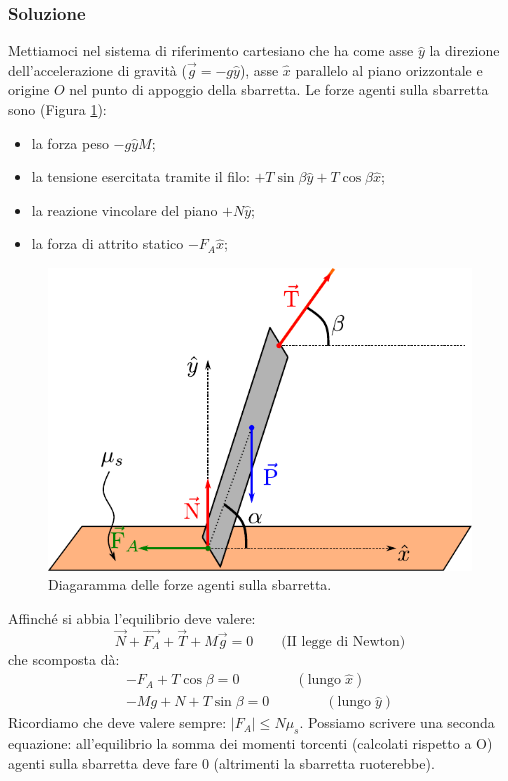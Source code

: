 \documentclass[12pt,a4paper]{book}
\begin{document}
\subsubsection*{Soluzione}
Mettiamoci nel sistema di riferimento cartesiano che ha come asse $\hat{y}$ la direzione dell'accelerazione di gravità
($\vec{g}=-g\hat{y}$), asse $\hat{x}$ parallelo al piano orizzontale e origine $O$ nel punto di appoggio della sbarretta.
Le forze agenti sulla sbarretta sono (Figura \ref{fig:sbar2}):
\begin{itemize}
\item la forza peso $-g\hat{y}M$;
\item la tensione esercitata tramite il filo: $+T\sin \beta \hat{y}+T\cos \beta \hat{x}$;
\item la reazione vincolare del piano $+N\hat{y}$;
\item la forza di attrito statico $-F_A \hat{x}$;
\end{itemize}


 \begin{figure}[!ht]
 \centering
\includegraphics[scale=1]{sbar2.pdf}
\caption{Diagaramma delle forze agenti sulla sbarretta. \label{fig:sbar2} }
\end{figure}

Affinché si abbia l'equilibrio deve valere:
\begin{equation*}
\vec{N} + \vec{F_A} + \vec{T} + M \vec{g}=0 \qquad \text{(II legge di Newton)}
\end{equation*}
che scomposta dà:
\begin{gather*}
-F_A + T \cos \beta=0 \qquad \qquad (\text{lungo}\;\hat{x})\\
-Mg+N+T\sin \beta=0 \qquad \qquad (\text{lungo}\;\hat{y})
\end{gather*}
Ricordiamo che deve valere sempre: $|F_A|\leq N \mu_s$. Possiamo scrivere una seconda equazione: all'equilibrio la somma dei momenti torcenti (calcolati rispetto a O) agenti sulla sbarretta deve fare 0 (altrimenti la sbarretta ruoterebbe). \\
\end{document}
